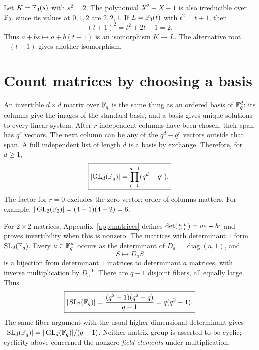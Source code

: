 \begin{example}
Let $K=\mathbb F_3(s)$ with $s^2=2$. The polynomial $X^2-X-1$ is also
irreducible over $\mathbb F_3$, since its values at $0,1,2$ are $2,2,1$.
If $L=\mathbb F_3(t)$ with $t^2=t+1$, then
\[
(t+1)^2=t^2+2t+1=2.
\]
Thus $a+bs\mapsto a+b(t+1)$ is an isomorphism $K\to L$.
The alternative root $-(t+1)$ gives another isomorphism.
\end{example}

\section{Count matrices by choosing a basis}
\label{sec:finite-field-matrix-counts}

An invertible $d\times d$ matrix over $\mathbb F_q$ is the same thing as an
ordered basis of $\mathbb F_q^d$: its columns give the images of the standard
basis, and a basis gives unique solutions to every linear system.
After $r$ independent columns have been chosen, their span has $q^r$
vectors. The next column can be any of the $q^d-q^r$ vectors outside
that span. A full independent list of length $d$ is a basis by exchange.
Therefore, for $d\ge1$,
\[
\boxed{\left|\operatorname{GL}_d(\mathbb F_q)\right|
=\prod_{r=0}^{d-1}(q^d-q^r).}
\]
The factor for $r=0$ excludes the zero vector; order of columns matters.
For example, $|\operatorname{GL}_2(\mathbb F_2)|=(4-1)(4-2)=6$.

For $2\times2$ matrices, Appendix~\ref{app:matrices} defines
$\det\begin{psmallmatrix}a&b\\c&e\end{psmallmatrix}=ae-bc$ and
proves invertibility when this is nonzero. The matrices with determinant
$1$ form $\operatorname{SL}_2(\mathbb F_q)$. Every $a\in\mathbb F_q^\times$ occurs
as the determinant of $D_a=\operatorname{diag}(a,1)$, and
\[
S\longmapsto D_aS
\]
is a bijection from determinant $1$ matrices to determinant $a$
matrices, with inverse multiplication by $D_a^{-1}$.
There are $q-1$ disjoint fibers, all equally large. Thus
\[
\boxed{|\operatorname{SL}_2(\mathbb F_q)|
=\frac{(q^2-1)(q^2-q)}{q-1}=q(q^2-1).}
\]
The same fiber argument with the usual higher-dimensional determinant
gives $|\operatorname{SL}_d(\mathbb F_q)|=|\operatorname{GL}_d(\mathbb F_q)|/(q-1)$.
Neither matrix group is asserted to be cyclic; cyclicity above concerned
the nonzero \emph{field elements} under multiplication.
